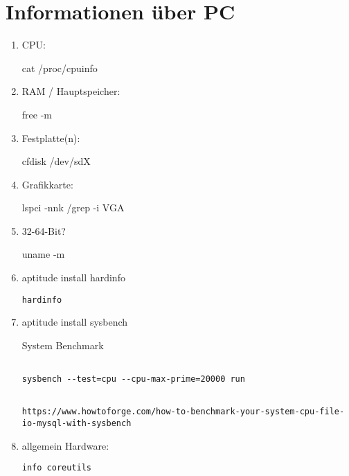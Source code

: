 \section{Informationen über PC}
\begin{enumerate}
\item CPU:

cat /proc/cpuinfo

\item RAM / Hauptspeicher:

free -m
\item Festplatte(n): 

cfdisk /dev/sdX

\item Grafikkarte:
	
	lspci -nnk /grep -i VGA

\item 32-64-Bit?

	uname -m

\item aptitude install hardinfo

\begin{verbatim}
hardinfo
\end{verbatim}

\item aptitude install sysbench 

System Benchmark
\begin{verbatim}

sysbench --test=cpu --cpu-max-prime=20000 run
 
\end{verbatim}

{\scriptsize
\begin{verbatim}
https://www.howtoforge.com/how-to-benchmark-your-system-cpu-file-io-mysql-with-sysbench
\end{verbatim}
}

\item allgemein Hardware:

\begin{verbatim}
info coreutils

\end{verbatim}

\end{enumerate}

